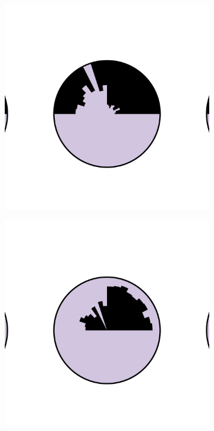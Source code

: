 \begin{figure}[t]
\begin{subfigure}{0.23\linewidth}
\centering
\includegraphics[width=\linewidth,clip,trim={2.4cm 4cm 1.7cm 4cm}]{infuse/g0}
\caption{}
\label{subfig:inward}
\end{subfigure}%
\hspace*{0.01\linewidth}%
\begin{subfigure}{0.23\linewidth}
\centering
\includegraphics[width=\linewidth,clip,trim={2.4cm 4cm 1.7cm 4cm}]{infuse/g1}

\end{subfigure}
\end{figure}

